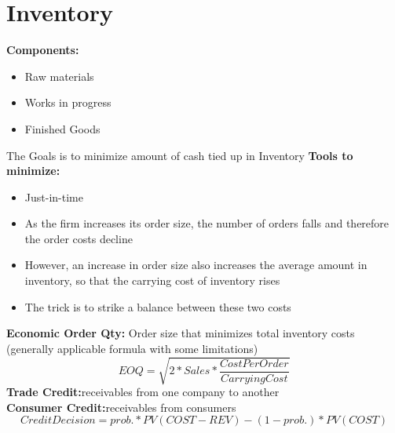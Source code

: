 \documentclass{cheatsheet}
\begin{document}
\section{Inventory}
\textbf{Components:}\begin{itemize}
  \item Raw materials
  \item Works in progress
  \item Finished Goods
\end{itemize}
The Goals is to minimize amount of cash tied up in Inventory
\textbf{Tools to minimize:}\begin{itemize}
  \item Just-in-time
  \item As the firm increases its order size, the number of orders falls and therefore the order costs decline
  \item However, an increase in order size also increases the average amount in inventory, so that the carrying cost of inventory rises
  \item The trick is to strike a balance between these two costs
\end{itemize}
\textbf{Economic Order Qty:} Order size that minimizes total inventory costs (generally applicable formula
with some limitations)
\[EOQ = \sqrt{2*Sales*\frac{CostPerOrder}{CarryingCost}}\]
\textbf{Trade Credit:}receivables from one company to another\\
\textbf{Consumer Credit:}receivables from consumers\\
\[Credit Decision = prob. * PV(COST-REV) - (1-prob.) * PV(COST)\]
\end{document}
